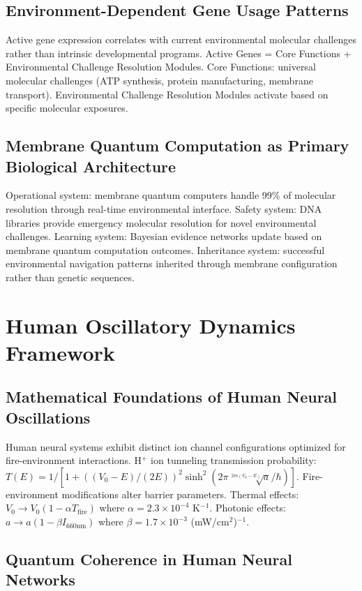 \documentclass[12pt,a4paper]{article}
\begin{document}
\subsection{Environment-Dependent Gene Usage Patterns}

Active gene expression correlates with current environmental molecular challenges rather than intrinsic developmental programs. Active Genes = Core Functions + Environmental Challenge Resolution Modules. Core Functions: universal molecular challenges (ATP synthesis, protein manufacturing, membrane transport). Environmental Challenge Resolution Modules activate based on specific molecular exposures.

\subsection{Membrane Quantum Computation as Primary Biological Architecture}

Operational system: membrane quantum computers handle 99\% of molecular resolution through real-time environmental interface. Safety system: DNA libraries provide emergency molecular resolution for novel environmental challenges. Learning system: Bayesian evidence networks update based on membrane quantum computation outcomes. Inheritance system: successful environmental navigation patterns inherited through membrane configuration rather than genetic sequences.

\section{Human Oscillatory Dynamics Framework}

\subsection{Mathematical Foundations of Human Neural Oscillations}

Human neural systems exhibit distinct ion channel configurations optimized for fire-environment interactions. H$^+$ ion tunneling transmission probability: $T(E) = 1/[1 + ((V_0 - E)/(2E))^2 \sinh^2(2\pi\sqrt[2m(V_0 - E)]a/\hbar)]$. Fire-environment modifications alter barrier parameters. Thermal effects: $V_0 \to V_0(1 - \alpha T_{\text{fire}})$ where $\alpha = 2.3 \times 10^{-4}$ K$^{-1}$. Photonic effects: $a \to a(1 - \beta I_{660\text{nm}})$ where $\beta = 1.7 \times 10^{-3}$ (mW/cm$^2$)$^{-1}$.

\subsection{Quantum Coherence in Human Neural Networks}
\end{document}
